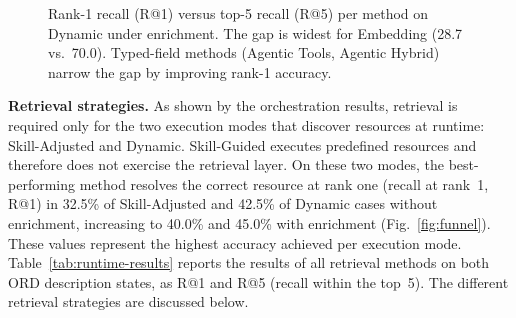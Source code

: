 \documentclass[10pt,twocolumn]{article}
\begin{document}
\begin{figure}[t]
  \centering
  \caption{Rank-1 recall (R@1) versus top-5 recall (R@5) per method on Dynamic under enrichment. The gap is widest for Embedding (28.7 vs.\ 70.0). Typed-field methods (Agentic Tools, Agentic Hybrid) narrow the gap by improving rank-1 accuracy.}
  \label{fig:gap}
\end{figure}

\textbf{Retrieval strategies.} As shown by the orchestration results, retrieval is required only for the two execution modes that discover resources at runtime: Skill-Adjusted and Dynamic. Skill-Guided executes predefined resources and therefore does not exercise the retrieval layer. On these two modes, the best-performing method resolves the correct resource at rank one (recall at rank~1, R@1) in 32.5\% of Skill-Adjusted and 42.5\% of Dynamic cases without enrichment, increasing to 40.0\% and 45.0\% with enrichment (Fig.~\ref{fig:funnel}). These values represent the highest accuracy achieved per execution mode. Table~\ref{tab:runtime-results} reports the results of all retrieval methods on both ORD description states, as R@1 and R@5 (recall within the top~5). The different retrieval strategies are discussed below.
\end{document}
